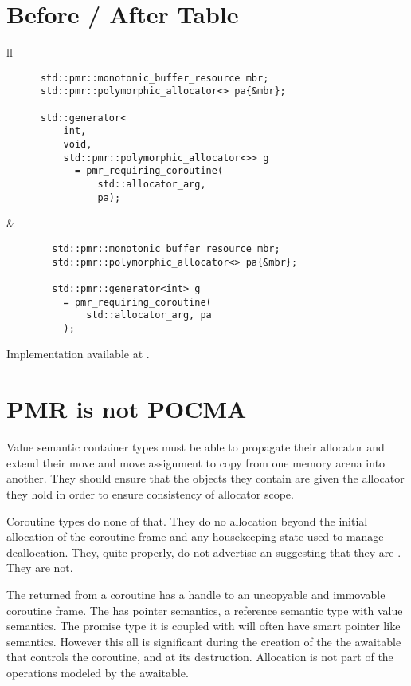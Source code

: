 \documentclass[a4paper,10pt,oneside,openany,final,article]{memoir}
\begin{document}
\chapter{Before / After Table}
\begin{tabular}{ ll }
  \begin{minipage}[t]{0.45\columnwidth}
    \begin{verbatim}
      std::pmr::monotonic_buffer_resource mbr;
      std::pmr::polymorphic_allocator<> pa{&mbr};

      std::generator<
          int,
          void,
          std::pmr::polymorphic_allocator<>> g
            = pmr_requiring_coroutine(
                std::allocator_arg,
                pa);
    \end{verbatim}
  \end{minipage}
  &
    \begin{minipage}[t]{0.45\columnwidth}
      \begin{verbatim}
        std::pmr::monotonic_buffer_resource mbr;
        std::pmr::polymorphic_allocator<> pa{&mbr};

        std::pmr::generator<int> g
          = pmr_requiring_coroutine(
              std::allocator_arg, pa
          );
      \end{verbatim}
    \end{minipage}
\end{tabular}

Implementation available at \cite{GB-IMPL:online}.

\chapter{PMR is not POCMA}
Value semantic container types must be able to propagate their allocator and extend their move and move assignment to copy from one memory arena into another. They should ensure that the objects they contain are given the allocator they hold in order to ensure consistency of allocator scope.

Coroutine types do none of that. They do no allocation beyond the initial allocation of the coroutine frame and any housekeeping state used to manage deallocation. They, quite properly, do not advertise an  suggesting that they are . They are not.

The  returned from a coroutine has a handle to an uncopyable and immovable coroutine frame. The  has pointer semantics, a reference semantic type with value semantics. The promise type it is coupled with will often have smart pointer like semantics. However this all is significant during the creation of the the awaitable that controls the coroutine, and at its destruction. Allocation is not part of the operations modeled by the awaitable.
\end{document}
